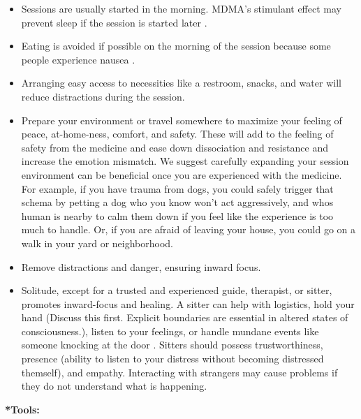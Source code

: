 \documentclass[12pt,letterpaper]{article}
\begin{document}
\begin{itemize}
    \item Sessions are usually started in the morning. MDMA's stimulant effect may prevent sleep if the session is started later \cite{berro2018acute}.
    \item Eating is avoided if possible on the morning of the session because some people experience nausea \cite{mithoeferManual}.
    \item Arranging easy access to necessities like a restroom, snacks, and water will reduce distractions during the session.
    \label{contextexpansion}
    \item Prepare your environment or travel somewhere to maximize your feeling of peace, at-home-ness, comfort, and safety. These will add to the feeling of safety from the medicine and ease down dissociation and resistance and increase the emotion mismatch. We suggest carefully expanding your session environment can be beneficial once you are experienced with the medicine. For example, if you have trauma from dogs, you could safely trigger that schema by petting a dog who you know won't act aggressively, and whos human is nearby to calm them down if you feel like the experience is too much to handle. Or, if you are afraid of leaving your house, you could go on a walk in your yard or neighborhood.
    \item Remove distractions and danger, ensuring inward focus. 
    \item Solitude, except for a trusted and experienced guide, therapist, or sitter, promotes inward-focus and healing. A sitter can help with logistics, hold your hand (Discuss this first. Explicit boundaries are essential in altered states of consciousness.), listen to your feelings, or handle mundane events like someone knocking at the door \cite{mithoeferManual,thalSitter}. Sitters should possess trustworthiness, presence (ability to listen to your distress without becoming distressed themself), and empathy. Interacting with strangers may cause problems if they do not understand what is happening. 
\end{itemize}
\noindent \textbf{*Tools:}
\end{document}
